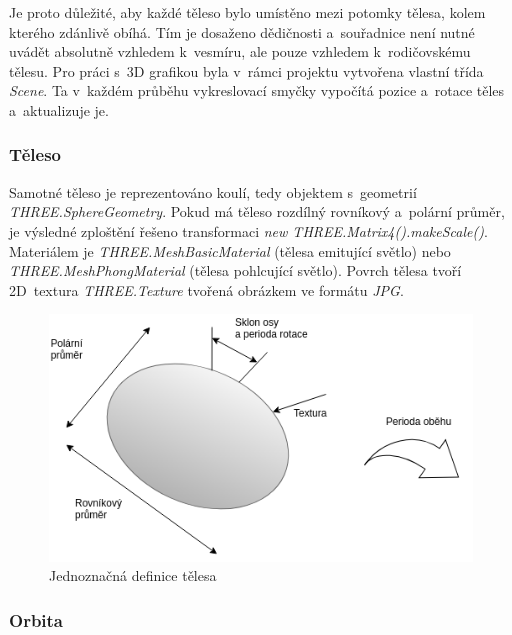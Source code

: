 \documentclass[a4paper,12pt]{article}
\begin{document}
Je proto důležité, aby každé těleso bylo umístěno mezi potomky tělesa, kolem kterého zdánlivě obíhá. Tím je dosaženo dědičnosti a~souřadnice není nutné uvádět absolutně vzhledem k~vesmíru, ale pouze vzhledem k~rodičovskému tělesu. Pro práci s~3D grafikou byla v~rámci projektu vytvořena vlastní třída \textit{Scene}. Ta v~každém průběhu vykreslovací smyčky vypočítá pozice a~rotace těles a~aktualizuje je.



\subsubsection{Těleso}

Samotné těleso je reprezentováno koulí, tedy objektem s~geometrií \textit{THREE.SphereGeometry}. Pokud má těleso rozdílný rovníkový a~polární průměr, je výsledné zploštění řešeno transformaci \textit{new THREE.Matrix4().makeScale()}. Materiálem je \textit{THREE.MeshBasicMaterial} (tělesa emitující světlo) nebo \textit{THREE.MeshPhongMaterial} (tělesa pohlcující světlo). Povrch tělesa tvoří 2D~textura \textit{THREE.Texture} tvořená obrázkem ve formátu \textit{JPG}.

\begin{figure}[H]
\begin{center}
\includegraphics[width=370pt]{Images/BodyData.png}
\caption[Jednoznačná definice tělesa]{Jednoznačná definice tělesa \footnotemark[1]}
\end{center}
\end{figure}


\subsubsection{Orbita}
\end{document}
